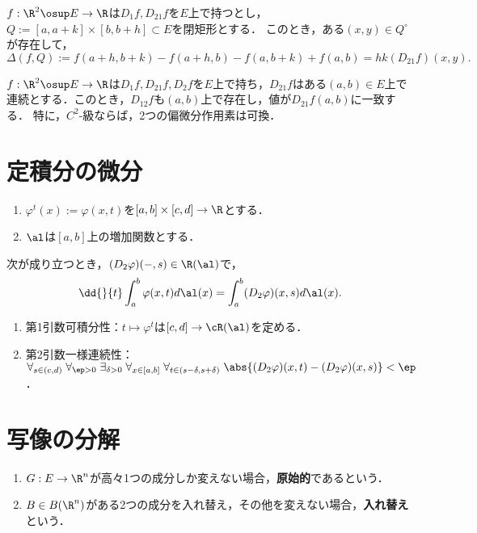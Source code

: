 \documentclass[uplatex, dvipdfmx]{jsreport}
\begin{document}
\begin{theorem}[平均値の定理]
    $f:\R^2\osup E\to\R$は$D_1f,D_{21}f$を$E$上で持つとし，$Q:=[a,a+k]\times[b,b+h]\subset E$を閉矩形とする．
    このとき，ある$(x,y)\in Q^\circ$が存在して，
    \[\Delta(f,Q):=f(a+h,b+k)-f(a+h,b)-f(a,b+k)+f(a,b)=hk(D_{21}f)(x,y).\]
\end{theorem}

\begin{theorem}
    $f:\R^2\osup E\to\R$は$D_1f,D_{21}f,D_2f$を$E$上で持ち，$D_{21}f$はある$(a,b)\in E$上で連続とする．このとき，$D_{12}f$も$(a,b)$上で存在し，値が$D_{21}f(a,b)$に一致する．
    特に，$C^2$-級ならば，2つの偏微分作用素は可換．
\end{theorem}

\section{定積分の微分}

\begin{notation}\mbox{}
    \begin{enumerate}
        \item $\varphi^t(x):=\varphi(x,t)$を$[a,b]\times[c,d]\to\R$とする．
        \item $\al$は$[a,b]$上の増加関数とする．
    \end{enumerate}
\end{notation}

\begin{theorem}
    次が成り立つとき，$(D_2\varphi)(-,s)\in\R(\al)$で，
    \[\dd{}{t}\int^b_a\varphi(x,t)d\al(x)=\int^b_a(D_2\varphi)(x,s)d\al(x).\]
    \begin{enumerate}
        \item 第1引数可積分性：$t\mapsto\varphi^t$は$[c,d]\to\cR(\al)$を定める．
        \item 第2引数一様連続性：$\forall_{s\in(c,d)}\;\forall_{\ep>0}\;\exists_{\delta>0}\;\forall_{x\in[a,b]}\;\forall_{t\in(s-\delta,s+\delta)}\;\abs{(D_2\varphi)(x,t)-(D_2\varphi)(x,s)}<\ep$．
    \end{enumerate}
\end{theorem}

\section{写像の分解}

\begin{definition}\mbox{}
    \begin{enumerate}
        \item $G:E\to\R^n$が高々1つの成分しか変えない場合，\textbf{原始的}であるという．
        \item $B\in B(\R^n)$がある2つの成分を入れ替え，その他を変えない場合，\textbf{入れ替え}という．
    \end{enumerate}
\end{definition}
\end{document}
